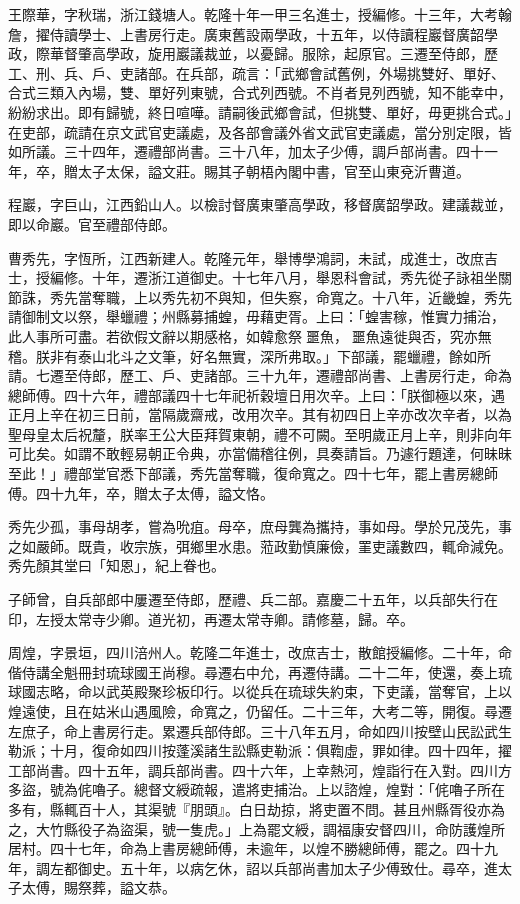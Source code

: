 \begin{pinyinscope}
王際華，字秋瑞，浙江錢塘人。乾隆十年一甲三名進士，授編修。十三年，大考翰詹，擢侍讀學士、上書房行走。廣東舊設兩學政，十五年，以侍讀程巖督廣韶學政，際華督肇高學政，旋用巖議裁並，以憂歸。服除，起原官。三遷至侍郎，歷工、刑、兵、戶、吏諸部。在兵部，疏言：「武鄉會試舊例，外場挑雙好、單好、合式三類入內場，雙、單好列東號，合式列西號。不肖者見列西號，知不能幸中，紛紛求出。即有歸號，終日喧嘩。請嗣後武鄉會試，但挑雙、單好，毋更挑合式。」在吏部，疏請在京文武官吏議處，及各部會議外省文武官吏議處，當分別定限，皆如所議。三十四年，遷禮部尚書。三十八年，加太子少傅，調戶部尚書。四十一年，卒，贈太子太保，謚文莊。賜其子朝梧內閣中書，官至山東兗沂曹道。

程巖，字巨山，江西鉛山人。以檢討督廣東肇高學政，移督廣韶學政。建議裁並，即以命巖。官至禮部侍郎。

曹秀先，字恆所，江西新建人。乾隆元年，舉博學鴻詞，未試，成進士，改庶吉士，授編修。十年，遷浙江道御史。十七年八月，舉恩科會試，秀先從子詠祖坐關節誅，秀先當奪職，上以秀先初不與知，但失察，命寬之。十八年，近畿蝗，秀先請御制文以祭，舉蠟禮；州縣募捕蝗，毋藉吏胥。上曰：「蝗害稼，惟實力捕治，此人事所可盡。若欲假文辭以期感格，如韓愈祭噩魚，噩魚遠徙與否，究亦無稽。朕非有泰山北斗之文筆，好名無實，深所弗取。」下部議，罷蠟禮，餘如所請。七遷至侍郎，歷工、戶、吏諸部。三十九年，遷禮部尚書、上書房行走，命為總師傅。四十六年，禮部議四十七年祀祈穀壇日用次辛。上曰：「朕御極以來，遇正月上辛在初三日前，當隔歲齋戒，改用次辛。其有初四日上辛亦改次辛者，以為聖母皇太后祝釐，朕率王公大臣拜賀東朝，禮不可闕。至明歲正月上辛，則非向年可比矣。如謂不敢輕易朝正令典，亦當備稽往例，具奏請旨。乃遽行題達，何昧昧至此！」禮部堂官悉下部議，秀先當奪職，復命寬之。四十七年，罷上書房總師傅。四十九年，卒，贈太子太傅，謚文恪。

秀先少孤，事母胡孝，嘗為吮疽。母卒，庶母龔為攜持，事如母。學於兄茂先，事之如嚴師。既貴，收宗族，弭鄉里水患。蒞政勤慎廉儉，罣吏議數四，輒命減免。秀先顏其堂曰「知恩」，紀上眷也。

子師曾，自兵部郎中屢遷至侍郎，歷禮、兵二部。嘉慶二十五年，以兵部失行在印，左授太常寺少卿。道光初，再遷太常寺卿。請修墓，歸。卒。

周煌，字景垣，四川涪州人。乾隆二年進士，改庶吉士，散館授編修。二十年，命偕侍講全魁冊封琉球國王尚穆。尋遷右中允，再遷侍講。二十二年，使還，奏上琉球國志略，命以武英殿聚珍板印行。以從兵在琉球失約束，下吏議，當奪官，上以煌遠使，且在姑米山遇風險，命寬之，仍留任。二十三年，大考二等，開復。尋遷左庶子，命上書房行走。累遷兵部侍郎。三十八年五月，命如四川按壁山民訟武生勒派；十月，復命如四川按蓬溪諸生訟縣吏勒派：俱鞫虛，罪如律。四十四年，擢工部尚書。四十五年，調兵部尚書。四十六年，上幸熱河，煌詣行在入對。四川方多盜，號為侂嚕子。總督文綬疏報，遣將吏捕治。上以諮煌，煌對：「侂嚕子所在多有，縣輒百十人，其渠號『朋頭』。白日劫掠，將吏置不問。甚且州縣胥役亦為之，大竹縣役子為盜渠，號一隻虎。」上為罷文綬，調福康安督四川，命防護煌所居村。四十七年，命為上書房總師傅，未逾年，以煌不勝總師傅，罷之。四十九年，調左都御史。五十年，以病乞休，詔以兵部尚書加太子少傅致仕。尋卒，進太子太傅，賜祭葬，謚文恭。


\end{pinyinscope}
